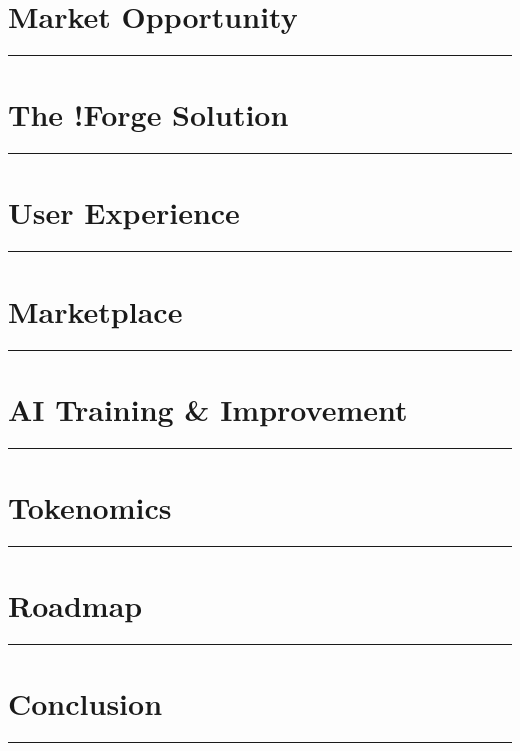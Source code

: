 \documentclass[11pt,a4paper]{article}
\newcommand{\fabSectionrule}{
    \vspace{-1ex}
    \noindent\textcolor{fabAccent}{\rule{\linewidth}{2pt}}
    \vspace{1ex}
}
\begin{document}
\clearpage
\section{Market Opportunity}
\fabSectionrule


\clearpage
\section{The !Forge Solution}
\fabSectionrule


\clearpage
\section{User Experience}
\fabSectionrule


\clearpage
\section{Marketplace}
\fabSectionrule


\clearpage
\section{AI Training \& Improvement}
\fabSectionrule


\clearpage
\section{Tokenomics}
\fabSectionrule


\clearpage
\section{Roadmap}
\fabSectionrule


\clearpage
\section{Conclusion}
\fabSectionrule

\end{document}

